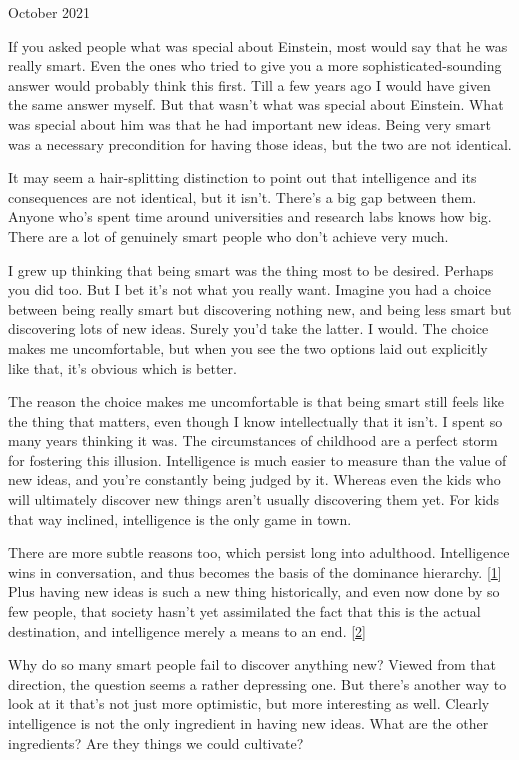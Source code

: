 October 2021

If you asked people what was special about Einstein, most would say that
he was really smart. Even the ones who tried to give you a more
sophisticated-sounding answer would probably think this first. Till a
few years ago I would have given the same answer myself. But that wasn't
what was special about Einstein. What was special about him was that he
had important new ideas. Being very smart was a necessary precondition
for having those ideas, but the two are not identical.

It may seem a hair-splitting distinction to point out that intelligence
and its consequences are not identical, but it isn't. There's a big gap
between them. Anyone who's spent time around universities and research
labs knows how big. There are a lot of genuinely smart people who don't
achieve very much.

I grew up thinking that being smart was the thing most to be desired.
Perhaps you did too. But I bet it's not what you really want. Imagine
you had a choice between being really smart but discovering nothing new,
and being less smart but discovering lots of new ideas. Surely you'd
take the latter. I would. The choice makes me uncomfortable, but when
you see the two options laid out explicitly like that, it's obvious
which is better.

The reason the choice makes me uncomfortable is that being smart still
feels like the thing that matters, even though I know intellectually
that it isn't. I spent so many years thinking it was. The circumstances
of childhood are a perfect storm for fostering this illusion.
Intelligence is much easier to measure than the value of new ideas, and
you're constantly being judged by it. Whereas even the kids who will
ultimately discover new things aren't usually discovering them yet. For
kids that way inclined, intelligence is the only game in town.

There are more subtle reasons too, which persist long into adulthood.
Intelligence wins in conversation, and thus becomes the basis of the
dominance hierarchy. {[}\hyperref[f1n]{1}{]} Plus having new ideas is
such a new thing historically, and even now done by so few people, that
society hasn't yet assimilated the fact that this is the actual
destination, and intelligence merely a means to an end.
{[}\hyperref[f2n]{2}{]}

Why do so many smart people fail to discover anything new? Viewed from
that direction, the question seems a rather depressing one. But there's
another way to look at it that's not just more optimistic, but more
interesting as well. Clearly intelligence is not the only ingredient in
having new ideas. What are the other ingredients? Are they things we
could cultivate?

